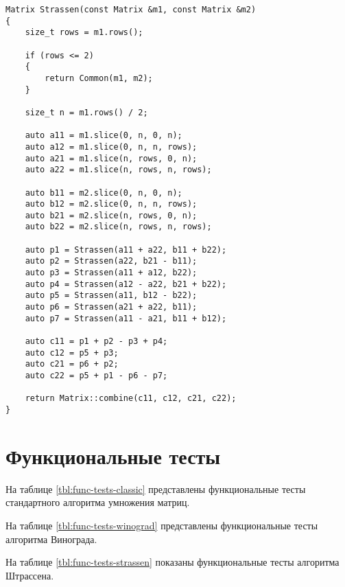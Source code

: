 \clearpage
\begin{lstlisting}[label={lst:strassen}, caption={Реализация алгоритма Штрассена}]
Matrix Strassen(const Matrix &m1, const Matrix &m2)
{
    size_t rows = m1.rows();

    if (rows <= 2)
    {
        return Common(m1, m2);
    }

    size_t n = m1.rows() / 2;
    
    auto a11 = m1.slice(0, n, 0, n);
    auto a12 = m1.slice(0, n, n, rows);
    auto a21 = m1.slice(n, rows, 0, n);
    auto a22 = m1.slice(n, rows, n, rows);

    auto b11 = m2.slice(0, n, 0, n);
    auto b12 = m2.slice(0, n, n, rows);
    auto b21 = m2.slice(n, rows, 0, n);
    auto b22 = m2.slice(n, rows, n, rows);

    auto p1 = Strassen(a11 + a22, b11 + b22);
    auto p2 = Strassen(a22, b21 - b11);
    auto p3 = Strassen(a11 + a12, b22);
    auto p4 = Strassen(a12 - a22, b21 + b22);
    auto p5 = Strassen(a11, b12 - b22);
    auto p6 = Strassen(a21 + a22, b11);
    auto p7 = Strassen(a11 - a21, b11 + b12);

    auto c11 = p1 + p2 - p3 + p4;
    auto c12 = p5 + p3;
    auto c21 = p6 + p2;
    auto c22 = p5 + p1 - p6 - p7;

    return Matrix::combine(c11, c12, c21, c22);
}
\end{lstlisting}

\section{Функциональные тесты}

На таблице \ref{tbl:func-tests-classic} представлены функциональные тесты стандартного алгоритма умножения матриц.

На таблице \ref{tbl:func-tests-winograd} представлены функциональные тесты алгоритма Винограда.

На таблице \ref{tbl:func-tests-strassen} показаны функциональные тесты алгоритма Штрассена.


